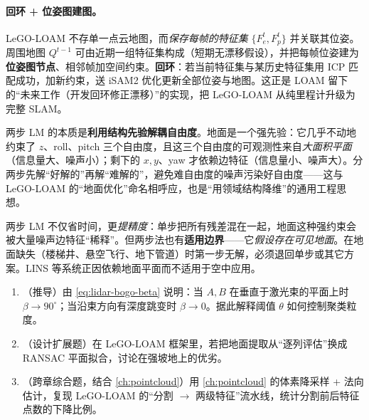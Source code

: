 \paragraph{回环 + 位姿图建图。}
LeGO-LOAM 不存单一点云地图，而\emph{保存每帧的特征集} $\{F^t_e,F^t_p\}$ 并关联其位姿\cite{shan2018legoloam}。周围地图 $Q^{t-1}$ 可由近期一组特征集构成（短期无漂移假设），并把每帧位姿建为\textbf{位姿图节点}、相邻帧加空间约束。\textbf{回环}：若当前特征集与某历史特征集用 ICP 匹配成功，加新约束，送 iSAM2\cite{kaess2012isam2} 优化更新全部位姿与地图。这正是 LOAM 留下的“未来工作（开发回环修正漂移）”的实现，把 LeGO-LOAM 从纯里程计升级为完整 SLAM。

\begin{insight}
两步 LM 的本质是\textbf{利用结构先验解耦自由度}。地面是一个强先验：它几乎不动地约束了 $z$、roll、pitch 三个自由度，且这三个自由度的可观测性来自\emph{大面积平面}（信息量大、噪声小）；剩下的 $x,y$、yaw 才依赖边特征（信息量小、噪声大）。分两步先解“好解的”再解“难解的”，避免难自由度的噪声污染好自由度——这与 LeGO-LOAM 的“地面优化”命名相呼应，也是“用领域结构降维”的通用工程思想。
\end{insight}

\begin{pitfall}
两步 LM 不仅省时间，更\emph{提精度}：单步把所有残差混在一起，地面这种强约束会被大量噪声边特征“稀释”。但两步法也有\textbf{适用边界}——它\emph{假设存在可见地面}。在地面缺失（楼梯井、悬空飞行、地下管道）时第一步无解，必须退回单步或其它方案。LINS 等系统正因依赖地面平面而不适用于空中应用。
\end{pitfall}

\begin{practice}
\begin{enumerate}
  \item （推导）由 \cref{eq:lidar-bogo-beta} 说明：当 $A,B$ 在垂直于激光束的平面上时 $\beta\to 90^\circ$；当沿束方向有深度跳变时 $\beta\to 0$。据此解释阈值 $\theta$ 如何控制聚类粒度。
  \item （设计扩展题）在 LeGO-LOAM 框架里，若把地面提取从“逐列评估”换成 RANSAC 平面拟合，讨论在强坡地上的优劣。
  \item （跨章综合题，结合 \cref{ch:pointcloud}）用 \cref{ch:pointcloud} 的体素降采样 + 法向估计，复现 LeGO-LOAM 的“分割 $\to$ 两级特征”流水线，统计分割前后特征点数的下降比例。
\end{enumerate}
\end{practice}


